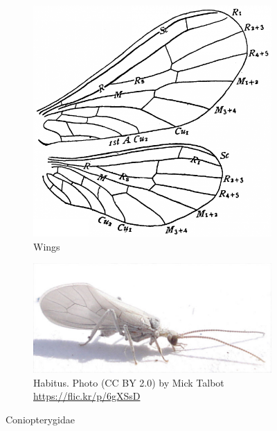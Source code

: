\documentclass[letterpaper, 11pt]{article}
\begin{document}
\begin{figure}[ht!]
    \centering
    \begin{subfigure}[ht!]{0.34\textwidth}
        \includegraphics[width=\textwidth]{ConiopterygidWing}
        \caption{Wings \citep[][Fig. 211]{comstock1918wings}}
        \label{fig:coniopterygid1}
    \end{subfigure}
    \qquad
    \begin{subfigure}[ht!]{0.5\textwidth}
        \includegraphics[width=\textwidth]{ConiopterygidHabitus}
        \caption{Habitus. Photo (CC BY 2.0) by Mick Talbot \url{https://flic.kr/p/6gXSsD}}
        \label{fig:coniopterygid2}
    \end{subfigure}
    \caption{Coniopterygidae}\label{fig:coniopterygids}
\end{figure}
\end{document}
